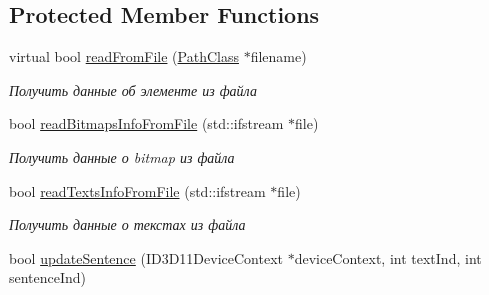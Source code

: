 \subsection*{Protected Member Functions}
\begin{DoxyCompactItemize}
\item 
virtual bool \hyperlink{class_interface_element_class_aadd932731787c60b3f395422188f2f58}{read\+From\+File} (\hyperlink{class_path_class}{Path\+Class} $\ast$filename)
\begin{DoxyCompactList}\small\item\em Получить данные об элементе из файла \end{DoxyCompactList}\item 
bool \hyperlink{class_interface_element_class_a80958e5556a2970645b65a56431c88ca}{read\+Bitmaps\+Info\+From\+File} (std\+::ifstream $\ast$file)
\begin{DoxyCompactList}\small\item\em Получить данные о bitmap из файла \end{DoxyCompactList}\item 
bool \hyperlink{class_interface_element_class_afc8ee340b6aa0b99e3280b424aa5c519}{read\+Texts\+Info\+From\+File} (std\+::ifstream $\ast$file)
\begin{DoxyCompactList}\small\item\em Получить данные о текстах из файла \end{DoxyCompactList}\item 
bool \hyperlink{class_interface_element_class_aa1908c476bd6d840acd22dd137fcbd00}{update\+Sentence} (I\+D3\+D11\+Device\+Context $\ast$device\+Context, int text\+Ind, int sentence\+Ind)
\end{DoxyCompactItemize}
